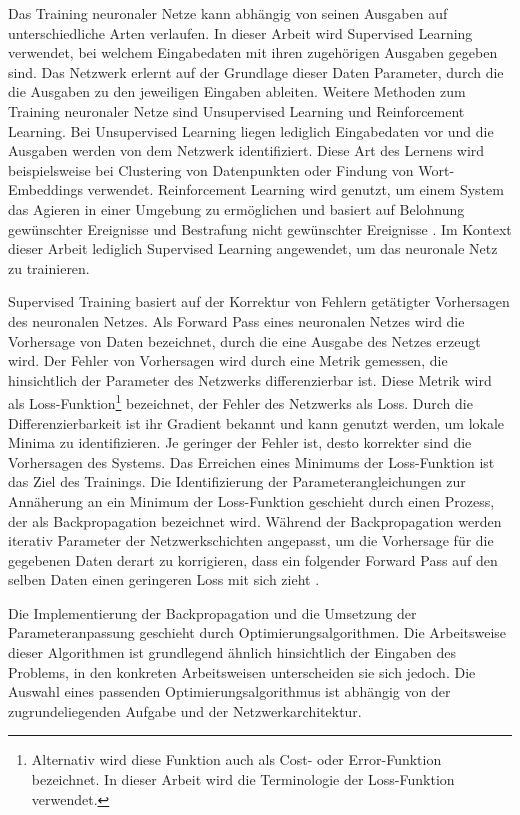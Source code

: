 Das Training neuronaler Netze kann abhängig von seinen Ausgaben auf unterschiedliche Arten verlaufen. In dieser Arbeit wird Supervised Learning verwendet, bei welchem Eingabedaten mit ihren zugehörigen Ausgaben gegeben sind. Das Netzwerk erlernt auf der Grundlage dieser Daten Parameter, durch die die Ausgaben zu den jeweiligen Eingaben ableiten. Weitere Methoden zum Training neuronaler Netze sind Unsupervised Learning und Reinforcement Learning. Bei Unsupervised Learning liegen lediglich Eingabedaten vor und die Ausgaben werden von dem Netzwerk identifiziert. Diese Art des Lernens wird beispielsweise bei Clustering von Datenpunkten oder Findung von Wort-Embeddings verwendet. Reinforcement Learning wird genutzt, um einem System das Agieren in einer Umgebung zu ermöglichen und basiert auf Belohnung gewünschter Ereignisse und Bestrafung nicht gewünschter Ereignisse \cite{nn_terminology}. Im Kontext dieser Arbeit lediglich Supervised Learning angewendet, um das neuronale Netz zu trainieren.

Supervised Training basiert auf der Korrektur von Fehlern getätigter Vorhersagen des neuronalen Netzes. Als Forward Pass eines neuronalen Netzes wird die Vorhersage von Daten bezeichnet, durch die eine Ausgabe des Netzes erzeugt wird. Der Fehler von Vorhersagen wird durch eine Metrik gemessen, die hinsichtlich der Parameter des Netzwerks differenzierbar ist. Diese Metrik wird als Loss-Funktion\footnote{Alternativ wird diese Funktion auch als Cost- oder Error-Funktion bezeichnet. In dieser Arbeit wird die Terminologie der Loss-Funktion verwendet.} bezeichnet, der Fehler des Netzwerks als Loss. Durch die Differenzierbarkeit ist ihr Gradient bekannt und kann genutzt werden, um lokale Minima zu identifizieren. Je geringer der Fehler ist, desto korrekter sind die Vorhersagen des Systems. Das Erreichen eines Minimums der Loss-Funktion ist das Ziel des Trainings. Die Identifizierung der Parameterangleichungen zur Annäherung an ein Minimum der Loss-Funktion geschieht durch einen Prozess, der als Backpropagation bezeichnet wird. Während der Backpropagation werden iterativ Parameter der Netzwerkschichten angepasst, um die Vorhersage für die gegebenen Daten derart zu korrigieren, dass ein folgender Forward Pass auf den selben Daten einen geringeren Loss mit sich zieht \cite{cv_general}.

Die Implementierung der Backpropagation und die Umsetzung der Parameteranpassung geschieht durch Optimierungsalgorithmen. Die Arbeitsweise dieser Algorithmen ist grundlegend ähnlich hinsichtlich der Eingaben des Problems, in den konkreten Arbeitsweisen unterscheiden sie sich jedoch. Die Auswahl eines passenden Optimierungsalgorithmus ist abhängig von der zugrundeliegenden Aufgabe und der Netzwerkarchitektur.

